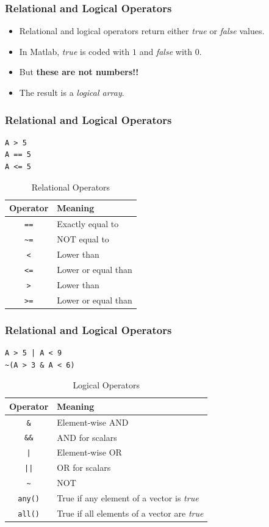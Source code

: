 \documentclass[11pt,xcolor={svgnames},aspectratio=169,usepdftitle=false,notheorems]{beamer}
\begin{document}
\begin{frame}
    \frametitle{Relational and Logical Operators}
\begin{itemize}
    \item Relational and logical operators return either \textit{true} or \textit{false} values.
    \item In Matlab, \textit{true} is coded with $1$ and \textit{false} with $0$.
    \item But \alert{\textbf{these are not numbers!!}}
    \item The result is a \textit{logical array}.
\end{itemize}
\end{frame}

\begin{frame}[fragile]
    \frametitle{Relational and Logical Operators}
\begin{lstlisting}
A > 5
A == 5
A <= 5
\end{lstlisting}

\begin{table}[htbp]
    \caption{Relational Operators}
    \label{tab:relational_operators}
    \begin{tabular}{@{}cl@{}}
    \toprule
    Operator & Meaning \\ \midrule
    \verb;==; & Exactly equal to \\
    \verb;~=; & NOT equal to \\
    \verb;<;  & Lower than \\
    \verb;<=; & Lower or equal than \\
    \verb;>;  & Lower than \\
    \verb;>=; & Lower or equal than \\ \bottomrule
    \end{tabular}
\end{table}
\end{frame}

\begin{frame}[fragile]
    \frametitle{Relational and Logical Operators}
\begin{lstlisting}
A > 5 | A < 9
~(A > 3 & A < 6)
\end{lstlisting}

\begin{table}[htbp]
    \caption{Logical Operators}
    \label{tab:logical_operators}
    \begin{tabular}{@{}cl@{}}
    \toprule
    Operator & Meaning \\ \midrule
    \verb;&; & Element-wise AND \\
    \verb;&&; & AND for scalars \\
    \verb;|;  & Element-wise OR \\
    \verb;||; & OR for scalars \\
    \verb;~;  & NOT \\ 
    \verb;any(); & True if any element of a vector is \textit{true} \\
    \verb;all(); & True if all elements of a vector are \textit{true} \\ \bottomrule
    \end{tabular}
\end{table}
\end{frame}
\end{document}
